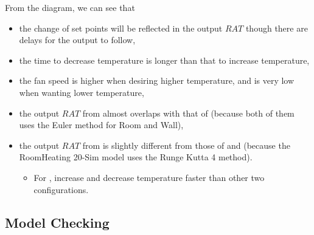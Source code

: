From the diagram, we can see that
\begin{itemize}
    \item the change of set points will be reflected in the output $RAT$ though there are delays for the output to follow,
    \item the time to decrease temperature is longer than that to increase temperature,
    \item the fan speed is higher when desiring higher temperature, and is very low when wanting lower temperature,
    \item the output $RAT$ from  almost overlaps with that of  (because both of them uses the Euler method for Room and Wall), 
	\item the output $RAT$ from  is slightly different from those of  and  (because the RoomHeating 20-Sim model uses the Runge Kutta 4 method).
        \begin{itemize}
            \item For , increase and decrease temperature faster than other two configurations.
        \end{itemize}
\end{itemize}

\subsection{Model Checking}

